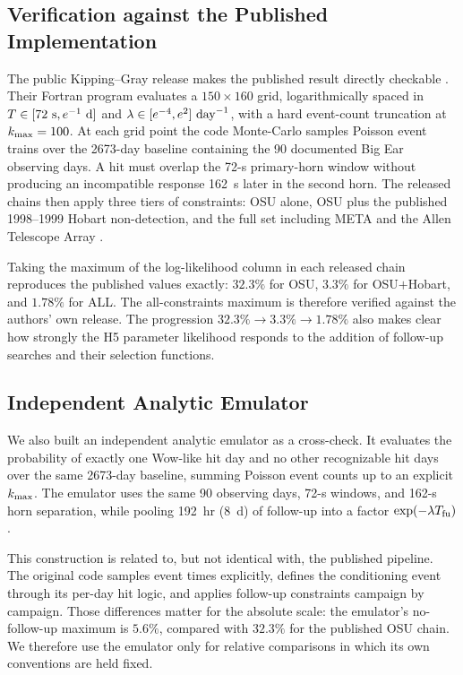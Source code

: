 \documentclass[crop]{CSL}
\newcommand{\kmax}{k_{\rm max}}
\begin{document}
\subsection{Verification against the Published Implementation}
\label{sec:h5_verify}

The public Kipping--Gray release makes the published result directly checkable \citep{kipping2022code}. Their Fortran program \citep[{\tt wow.f90};][]{kipping2022code} evaluates a $150\times160$ grid, logarithmically spaced in $T\in[72~{\rm s},e^{-1}~{\rm d}]$ and $\lambda\in[e^{-4},e^2]~{\rm day}^{-1}$, with a hard event-count truncation at $\kmax=100$. At each grid point the code Monte-Carlo samples Poisson event trains over the 2673-day baseline containing the 90 documented Big Ear observing days. A hit must overlap the 72-s primary-horn window without producing an incompatible response 162~s later in the second horn. The released chains then apply three tiers of constraints: OSU alone, OSU plus the published 1998--1999 Hobart non-detection, and the full set including META and the Allen Telescope Array \citep{harp2020}.

Taking the maximum of the log-likelihood column in each released chain reproduces the published values exactly: $32.3\%$ for OSU, $3.3\%$ for OSU$+$Hobart, and $1.78\%$ for ALL. The all-constraints maximum is therefore verified against the authors' own release. The progression $32.3\%\rightarrow3.3\%\rightarrow1.78\%$ also makes clear how strongly the H5 parameter likelihood responds to the addition of follow-up searches and their selection functions.

\subsection{Independent Analytic Emulator}
\label{sec:h5_emulator}

We also built an independent analytic emulator as a cross-check. It evaluates the probability of exactly one Wow-like hit day and no other recognizable hit days over the same 2673-day baseline, summing Poisson event counts up to an explicit $\kmax$. The emulator uses the same 90 observing days, 72-s windows, and 162-s horn separation, while pooling 192~hr (8~d) of follow-up into a factor $\exp(-\lambda T_{\rm fu})$.

This construction is related to, but not identical with, the published pipeline. The original code samples event times explicitly, defines the conditioning event through its per-day hit logic, and applies follow-up constraints campaign by campaign. Those differences matter for the absolute scale: the emulator's no-follow-up maximum is $5.6\%$, compared with $32.3\%$ for the published OSU chain. We therefore use the emulator only for relative comparisons in which its own conventions are held fixed.
\end{document}
